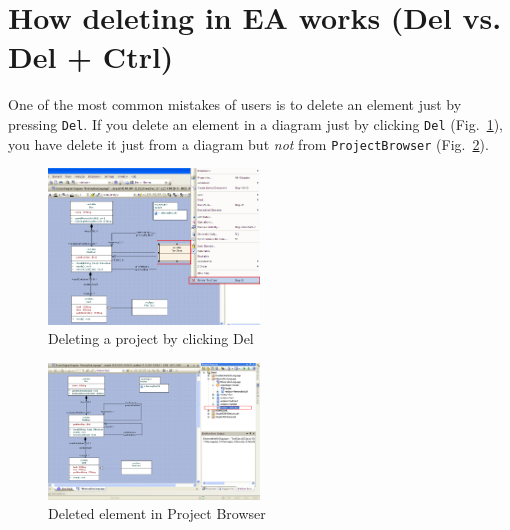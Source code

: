 \section{How deleting in EA works (Del vs. Del + Ctrl) }
One of the most common mistakes of users is to delete an element just by 
pressing \texttt{Del}.   
If you delete an element in a diagram just by clicking
\texttt{Del} (Fig.~\ref{fig_DelVsCtrlDel01}), you have delete it just from a diagram
but \emph{not} from \texttt{ProjectBrowser} (Fig.~\ref{fig_DelVsCtrlDel02}).

\begin{figure}[htbp]
\begin{center}
  \includegraphics[width=0.5\textwidth]{pics/tricks/DelVsCtrlDel/DelVsCtrlDel1}
  \caption{Deleting a project by clicking Del}  
  
    \label{fig_DelVsCtrlDel01}
\end{center}
\end{figure}  

\begin{figure}[htbp]
\begin{center}
  \includegraphics[width=0.5\textwidth]{pics/tricks/DelVsCtrlDel/DelVsCtrlDel2}
  \caption{Deleted element in Project Browser}  
  \label{fig_DelVsCtrlDel02}
\end{center}
\end{figure}  

